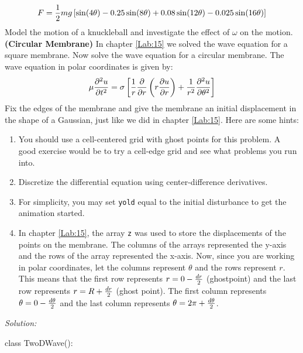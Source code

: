\begin{enumerate}
\begin{equation}
F = {1\over 2} mg \left[ \sin (4\theta) - 0.25\sin (8\theta) + 0.08\sin
  (12\theta) - 0.025\sin (16\theta)\right] 
\end{equation}  
Model the motion of a knuckleball and investigate the effect of
$\omega$ on the motion.
\prob \textbf{(Circular Membrane)} In chapter \ref{Lab:15} we solved the wave equation for a
  square membrane.  Now solve the wave equation for a circular
  membrane.  The wave equation in polar coordinates is given by:
\begin{equation}
\mu \frac{\partial^2 u}{\partial t^2} = \sigma \left[ {1\over r}
  \frac{\partial}{\partial r} \left( r \frac{\partial u}{\partial
      r}\right) + {1\over r^2} \frac{\partial^2 u}{\partial \theta^2} \right]
\end{equation}
Fix the edges of the membrane and give the membrane an initial
displacement in the shape of a Gaussian, just like we did in chapter
\ref{Lab:15}.  Here are some hints:
\begin{enumerate}
\item You should use a cell-centered grid with ghost points for this problem.  A good
  exercise would be to try a cell-edge grid and see what problems you
  run into.
\item Discretize the differential equation using center-difference
  derivatives.
\item For simplicity, you may set \texttt{yold} equal to the initial
  disturbance to get the animation started.
\item In chapter \ref{Lab:15}, the array \texttt{z} was used to store the
  displacements of the points on the membrane.  The columns of the
  arrays represented the y-axis and the rows of the array represented
  the x-axis. Now, since you are working in polar coordinates, let the
  columns represent $\theta$ and the rows represent $r$.  This means
  that the first row represents $r = 0 - {dr\over 2}$ (ghostpoint) and the last row represents $r
  = R + {dr\over 2}$ (ghost point).  The first column represents $\theta = 0 -
  {d \theta \over 2}$ and the last column
  represents $\theta = 2 \pi + {d \theta\over 2}$.
\end{enumerate}
\ifsolutions
\textit{Solution:}\\
\begin{codeexample}
\begin{VerbatimOut}{\listingFile}




class TwoDWave():


\end{VerbatimOut}
\end{codeexample}
\end{enumerate}

